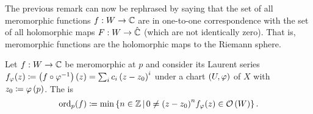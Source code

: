 \documentclass[../Moduli_Spaces_of_Riemann_Surfaces.tex]{subfiles}
\begin{document}
    \begin{remark}
        The previous remark can now be rephrased by saying that the set of all meromorphic functions $f:W\to\mathbb{C}$ are in one-to-one correspondence with the set of all holomorphic maps $F:W\to\hat{\mathbb{C}}$ (which are not identically zero). That is, meromorphic functions are the holomorphic maps to the Riemann sphere.\exqed
    \end{remark}
    \begin{definition}\label{1.2:def:order}
        Let $f:W\to\mathbb{C}$ be meromorphic at $p$ and consider its Laurent series $f_\varphi\!\left(z\right)\coloneqq\left(f\circ\varphi^{-1}\right)\left(z\right)=\sum_{i}c_i\left(z-z_0\right)^i$ under a chart $\left(U,\varphi\right)$ of $X$ with $z_0\coloneqq\varphi\left(p\right)$. The  is
        \begin{equation*}
            \operatorname{ord}_p\!\left(f\right)\coloneqq\operatorname{min}\left\{n\in\mathbb{Z}\,\middle\vert\,0\neq\left(z-z_0\right)^n\!f_\varphi\!\left(z\right)\in\mathcal{O}\left(W\right)\right\}.
        \end{equation*}
    \end{definition}
    \vspace{-0.05in}
\end{document}
